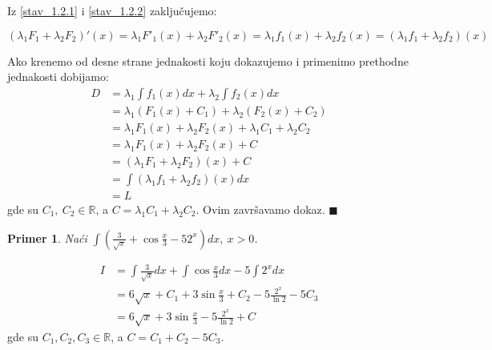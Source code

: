 \documentclass{article}
\newtheorem{prim}{Primer}[section]
\begin{document}
Iz \eqref{stav_1.2.1} i \eqref{stav_1.2.2} zaključujemo:

\begin{equation} \label{stav_1.2.3}
    (\lambda_1 F_1 + \lambda_2 F_2)'(x) =
    \lambda_1 F'_1(x) + \lambda_2 F'_2(x) =
    \lambda_1 f_1(x) + \lambda_2 f_2(x) =
    (\lambda_1 f_1 + \lambda_2 f_2)(x)
\end{equation}

Ako krenemo od desne strane jednakosti koju dokazujemo i
primenimo prethodne jednakosti dobijamo:
\begin{align*}
    D & = \lambda_1\int f_1(x) dx + \lambda_2\int f_2(x) dx \\ &=
    \lambda_1(F_1(x) + C_1) + \lambda_2(F_2(x) + C_2)       \\ &=
    \lambda_1  F_1(x) + \lambda_2  F_2(x) +
    \lambda_1  C_1 + \lambda_2  C_2                         \\ &=
    \lambda_1  F_1(x) + \lambda_2  F_2(x) + C               \\ &=
    (\lambda_1 F_1 + \lambda_2 F_2)(x) + C                  \\ &=
    \int (\lambda_1 f_1+ \lambda_2 f_2)(x)dx                \\ &=
    L
\end{align*}
gde su $C_1,\ C_2\in\mathbb{R}$, a $C=\lambda_1C_1+\lambda_2C_2$. Ovim završavamo dokaz.
\null\hfill $\blacksquare$ \par
\begin{primbox}
    \begin{prim}
        Naći $\int (\frac{3}{\sqrt{x}} +
            \cos\frac{x}{3} - 52^x)dx,\ x > 0$.
    \end{prim}
    \begin{align*}
        I & = \int\frac{3}{\sqrt{x}} dx + \int \cos\frac{x}{3} dx - 5\int 2^x dx
        \\ & = 6\sqrt{x} + C_1 + 3\sin\frac{x}{3} + C_2 - 5\frac{2^x}{\ln{2}} - 5C_3
        \\ & = 6\sqrt{x} + 3\sin\frac{x}{3} - 5\frac{2^x}{\ln{2}} + C
    \end{align*}
    gde su $C_1,C_2,C_3\in\mathbb{R}$, a $C=C_1+C_2-5C_3$.
\end{primbox}
\end{document}
